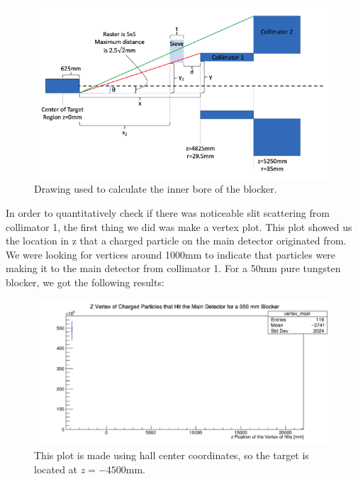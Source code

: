 \begin{figure}[H]
    \centering
    \includegraphics[width=\textwidth]{Images/InnerBoreGeometryDrawing.png}
    \caption{Drawing used to calculate the inner bore of the blocker.}
    \label{fig:innerBoreDrawing}
\end{figure}

In order to quantitatively check if there was noticeable slit scattering from collimator 1, the first thing we did was make a vertex plot. This plot showed us the location in z that a charged particle on the main detector originated from. We were looking for vertices around 1000mm to indicate that particles were making it to the main detector from collimator 1. For a 50mm pure tungsten blocker, we got the following results:

\begin{figure}[H]
    \centering
    \includegraphics[width=\textwidth]{Images/VertexPlotCPMainDet50mmBlocker.png}
    \caption{This plot is made using hall center coordinates, so the target is located at $z=-4500$mm.}
    \label{fig:vertexblocker}
\end{figure}

